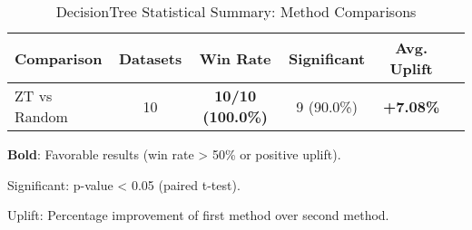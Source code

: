 \begin{table}[htbp]
\centering
\caption{DecisionTree Statistical Summary: Method Comparisons}
\label{tab:decisiontree_stats_summary}
\begin{tabular}{lccccc}
\toprule
Comparison & Datasets & Win Rate & Significant & Avg. Uplift \\
\midrule
ZT vs Random & 10 & \textbf{10/10 (100.0\%)} & 9 (90.0\%) & \textbf{+7.08\%} \\
\bottomrule
\end{tabular}
\begin{tablenotes}
\small
\item \textbf{Bold}: Favorable results (win rate > 50\% or positive uplift).
\item Significant: p-value < 0.05 (paired t-test).
\item Uplift: Percentage improvement of first method over second method.
\end{tablenotes}
\end{table}